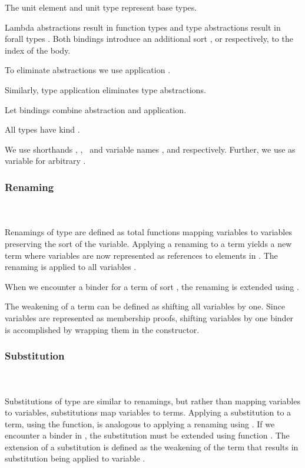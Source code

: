 \noindent The unit element  and unit type  represent base types. 

\noindent Lambda abstractions   result in function types    and type abstractions   result in forall types  . 
Both bindings introduce an additional sort , or  respectively, to the index of the body.

\noindent To eliminate abstractions we use application   .

\noindent Similarly, type application    eliminates type abstractions. 

\noindent Let bindings     combine abstraction and application. 

\noindent All types  have kind .

\noindent We use shorthands \FVar, \FExpr, \FType\ and variable names ,  and  respectively. Further, we use  as variable for arbitrary   .

\subsubsection{Renaming}\hfill\\\\
Renamings  of type    are defined as total functions mapping variables    to variables    preserving the sort  of the variable.
\FRen
Applying a renaming    to a term    yields a new term    where variables are now represented as references to elements in .
\Fren
The renaming is applied to all variables .

\noindent When we encounter a binder for a term of sort , the renaming is extended using \Frenext. 

\noindent The weakening of a term can be defined as shifting all variables by one.
\Fwk 
Since variables are represented as membership proofs, shifting variables by one binder is accomplished by wrapping them in the  constructor.

\subsubsection{Substitution}\hfill\\\\
Substitutions  of type    are similar to renamings, but rather than mapping variables to variables, substitutions map variables to terms.
\FSub
Applying a substitution to a term, using the  function, is analogous to applying a renaming using . If we encounter a binder in , the substitution must be extended using function .
\Fext
The extension of a substitution is defined as the weakening of the term that results in substitution being applied to variable .


